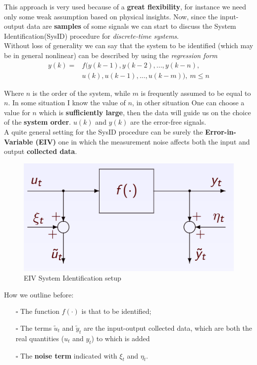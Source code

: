 \vspace{0.2cm}
\noindent
This approach is very used because of a \textbf{great flexibility}, for instance we need only some weak assumption based on physical insights.
Now, since the input-output data are \textbf{samples} of some signals we can start to discuss the System Identification(SysID) procedure for \textit{discrete-time systems}.\\
Without loss of generality we can say that the system to be identified (which may be in general nonlinear) can be described by using the \textit{regression form}
{\large{
    \begin{equation} \label{eq: regression_form}
        \begin{aligned}
            y(k)=&f(y(k-1), y(k-2), ...,y(k-n), \\
            &u(k), u(k-1), ..., u(k-m)), \ m\le n
        \end{aligned}
    \end{equation}
}}

Where $n$ is the order of the system, while $m$ is frequently assumed to be equal to $n$. In some situation I know the value of $n$, in other situation One can choose a value for $n$ which is \textbf{sufficiently large}, then the data will guide us on the choice of the \textbf{system order}. $u(k)$ and $y(k)$ are the error-free signals.\\
A quite general setting for the SysID procedure can be surely the \textbf{Error-in-Variable (EIV)} one in which the measurement noise affects both the input and output \textbf{collected data}. 

\begin{figure}[h]
    \centering
    \includegraphics[scale=0.77]{images/EIV.png}
    \caption{EIV System Identification setup}
\end{figure}

\vspace{0.5cm}
\noindent
How we outline before:
\begin{itemize}
    \itemsep0em
    \item[$\square$] The function $f(\cdot)$ is that to be identified;
   \item[$\square$] The terms $\tilde{u}_t$ and $\tilde{y}_t$ are the input-output collected data, which are both the real quantities ($u_t$ and $y_t$) to which is added 
   \item[$\square$] The \textbf{noise term} indicated with $\xi_t$ and $\eta_t$.
\end{itemize}

